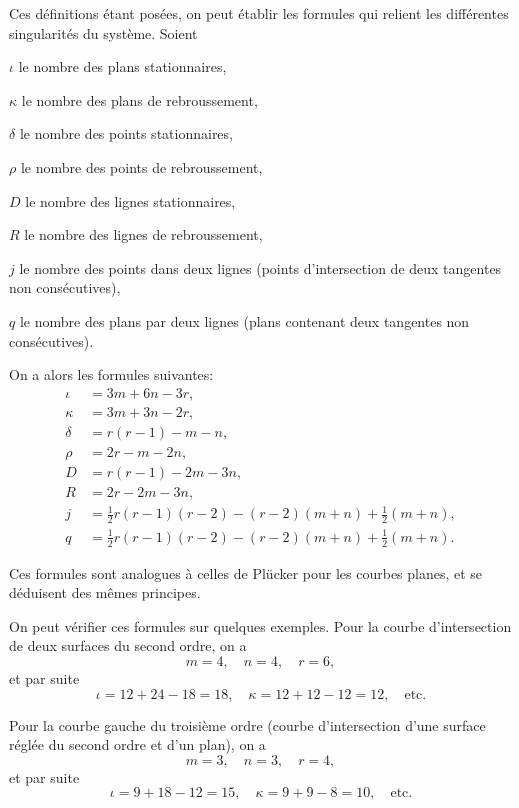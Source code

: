 \documentclass[11pt,a4paper]{article}
\begin{document}
\newpage
\setcounter{page}{210}

Ces d\'{e}finitions \'{e}tant pos\'{e}es, on peut \'{e}tablir les formules qui relient les diff\'{e}rentes
singularit\'{e}s du syst\`{e}me. Soient

$\iota$ le nombre des plans stationnaires,

$\kappa$ le nombre des plans de rebroussement,

$\delta$ le nombre des points stationnaires,

$\rho$ le nombre des points de rebroussement,

$D$ le nombre des lignes stationnaires,

$R$ le nombre des lignes de rebroussement,

$j$ le nombre des points dans deux lignes (points d'intersection de deux tangentes non
cons\'{e}cutives),

$q$ le nombre des plans par deux lignes (plans contenant deux tangentes non cons\'{e}cutives).

\newpage
\setcounter{page}{211}

On a alors les formules suivantes:
\begin{align*}
\iota &= 3m + 6n - 3r,\\
\kappa &= 3m + 3n - 2r,\\
\delta &= r(r-1) - m - n,\\
\rho &= 2r - m - 2n,\\
D &= r(r-1) - 2m - 3n,\\
R &= 2r - 2m - 3n,\\
j &= \tfrac{1}{2}r(r-1)(r-2) - (r-2)(m+n) + \tfrac{1}{2}(m+n),\\
q &= \tfrac{1}{2}r(r-1)(r-2) - (r-2)(m+n) + \tfrac{1}{2}(m+n).
\end{align*}

Ces formules sont analogues \`{a} celles de Pl\"{u}cker pour les courbes planes, et se d\'{e}duisent
des m\^{e}mes principes.

\newpage
\setcounter{page}{212}

On peut v\'{e}rifier ces formules sur quelques exemples. Pour la courbe d'intersection
de deux surfaces du second ordre, on a
\[
m = 4, \quad n = 4, \quad r = 6,
\]
et par suite
\[
\iota = 12 + 24 - 18 = 18, \quad \kappa = 12 + 12 - 12 = 12, \quad \text{etc.}
\]

Pour la courbe gauche du troisi\`{e}me ordre (courbe d'intersection d'une surface r\'{e}gl\'{e}e
du second ordre et d'un plan), on a
\[
m = 3, \quad n = 3, \quad r = 4,
\]
et par suite
\[
\iota = 9 + 18 - 12 = 15, \quad \kappa = 9 + 9 - 8 = 10, \quad \text{etc.}
\]
\end{document}
